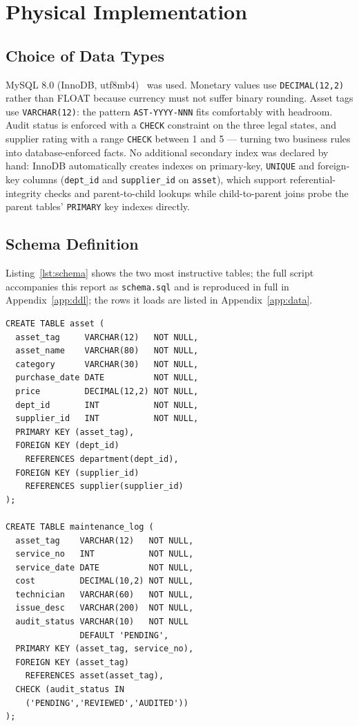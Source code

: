 \documentclass[conference]{IEEEtran}
\begin{document}
\section{Physical Implementation}
\subsection{Choice of Data Types}
MySQL 8.0 (InnoDB, utf8mb4)~\cite{mysql} was used. Monetary values use
\texttt{DECIMAL(12,2)} rather than FLOAT because currency must not suffer
binary rounding. Asset tags use \texttt{VARCHAR(12)}: the pattern
\texttt{AST-YYYY-NNN} fits comfortably with headroom. Audit status is
enforced with a \texttt{CHECK} constraint on the three legal states, and
supplier rating with a range \texttt{CHECK} between 1 and 5 --- turning two
business rules into database-enforced facts. No additional secondary index
was declared by hand: InnoDB automatically creates indexes on primary-key,
\texttt{UNIQUE} and foreign-key columns (\texttt{dept\_id} and
\texttt{supplier\_id} on \texttt{asset}), which support referential-integrity
checks and parent-to-child lookups while child-to-parent joins probe the
parent tables' \texttt{PRIMARY} key indexes directly.

\subsection{Schema Definition}
Listing~\ref{lst:schema} shows the two most instructive tables; the full
script accompanies this report as \texttt{schema.sql} and is reproduced in
full in Appendix~\ref{app:ddl}; the rows it loads are listed in
Appendix~\ref{app:data}.

\begin{lstlisting}[style=sqlstyle, caption={Core DDL (excerpt from schema.sql)}, label={lst:schema}]
CREATE TABLE asset (
  asset_tag     VARCHAR(12)   NOT NULL,
  asset_name    VARCHAR(80)   NOT NULL,
  category      VARCHAR(30)   NOT NULL,
  purchase_date DATE          NOT NULL,
  price         DECIMAL(12,2) NOT NULL,
  dept_id       INT           NOT NULL,
  supplier_id   INT           NOT NULL,
  PRIMARY KEY (asset_tag),
  FOREIGN KEY (dept_id)
    REFERENCES department(dept_id),
  FOREIGN KEY (supplier_id)
    REFERENCES supplier(supplier_id)
);

CREATE TABLE maintenance_log (
  asset_tag    VARCHAR(12)   NOT NULL,
  service_no   INT           NOT NULL,
  service_date DATE          NOT NULL,
  cost         DECIMAL(10,2) NOT NULL,
  technician   VARCHAR(60)   NOT NULL,
  issue_desc   VARCHAR(200)  NOT NULL,
  audit_status VARCHAR(10)   NOT NULL
               DEFAULT 'PENDING',
  PRIMARY KEY (asset_tag, service_no),
  FOREIGN KEY (asset_tag)
    REFERENCES asset(asset_tag),
  CHECK (audit_status IN
    ('PENDING','REVIEWED','AUDITED'))
);
\end{lstlisting}
\end{document}
